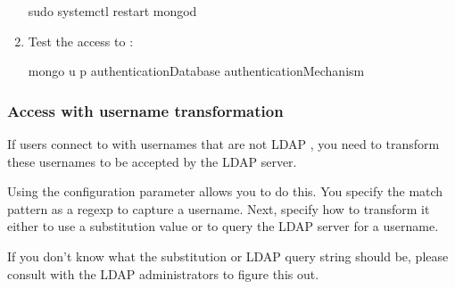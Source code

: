 \documentclass[letterpaper,10pt,english]{sphinxmanual}
\begin{document}
\begin{enumerate}
\begin{sphinxVerbatim}[commandchars=\\\{\}]
\PYGZdl{} sudo systemctl restart mongod
\end{sphinxVerbatim}

\item {} 
\sphinxAtStartPar
Test the access to :

\begin{sphinxVerbatim}[commandchars=\\\{\}]
mongo \PYGZhy{}u  \PYGZhy{}p  \PYGZhy{}\PYGZhy{}authenticationDatabase  \PYGZhy{}\PYGZhy{}authenticationMechanism 
\end{sphinxVerbatim}

\end{enumerate}


\subsubsection{Access with username transformation}
\label{\detokenize{ldap-setup:access-with-username-transformation}}
\sphinxAtStartPar
If users connect to  with usernames that are not LDAP , you need to transform these usernames to be accepted by the LDAP server.

\sphinxAtStartPar
Using the  configuration parameter allows you to do this. You specify the match pattern as a regexp to capture a username. Next, specify how to transform it \sphinxhyphen{} either to use a substitution value or to query the LDAP server for a username.

\sphinxAtStartPar
If you don’t know what the substitution or LDAP query string should be, please consult with the LDAP administrators to figure this out.
\end{document}
